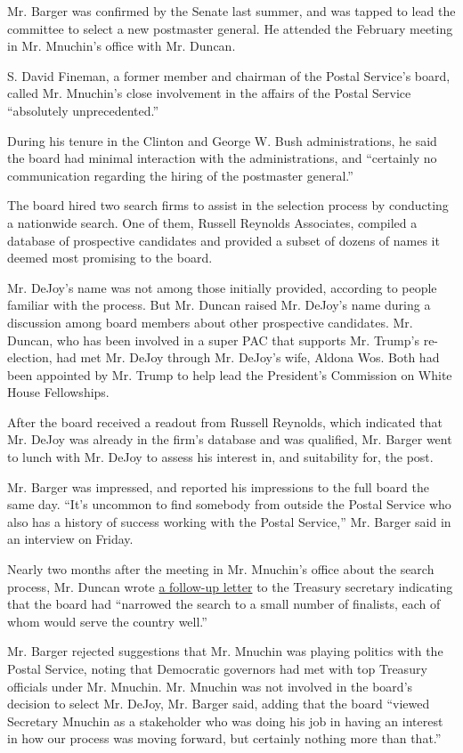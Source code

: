 Mr. Barger was confirmed by the Senate last summer, and was tapped to
lead the committee to select a new postmaster general. He attended the
February meeting in Mr. Mnuchin's office with Mr. Duncan.

S. David Fineman, a former member and chairman of the Postal Service's
board, called Mr. Mnuchin's close involvement in the affairs of the
Postal Service ``absolutely unprecedented.''

During his tenure in the Clinton and George W. Bush administrations, he
said the board had minimal interaction with the administrations, and
``certainly no communication regarding the hiring of the postmaster
general.''

The board hired two search firms to assist in the selection process by
conducting a nationwide search. One of them, Russell Reynolds
Associates, compiled a database of prospective candidates and provided a
subset of dozens of names it deemed most promising to the board.

Mr. DeJoy's name was not among those initially provided, according to
people familiar with the process. But Mr. Duncan raised Mr. DeJoy's name
during a discussion among board members about other prospective
candidates. Mr. Duncan, who has been involved in a super PAC that
supports Mr. Trump's re-election, had met Mr. DeJoy through Mr. DeJoy's
wife, Aldona Wos. Both had been appointed by Mr. Trump to help lead the
President's Commission on White House Fellowships.

After the board received a readout from Russell Reynolds, which
indicated that Mr. DeJoy was already in the firm's database and was
qualified, Mr. Barger went to lunch with Mr. DeJoy to assess his
interest in, and suitability for, the post.

Mr. Barger was impressed, and reported his impressions to the full board
the same day. ``It's uncommon to find somebody from outside the Postal
Service who also has a history of success working with the Postal
Service,'' Mr. Barger said in an interview on Friday.

Nearly two months after the meeting in Mr. Mnuchin's office about the
search process, Mr. Duncan wrote
\href{https://s3.amazonaws.com/storage.citizensforethics.org/wp-content/uploads/2020/08/19160346/COVID-19-VIP-Duncan-USPS-Board-Chairman-on.pdf}{a
follow-up letter} to the Treasury secretary indicating that the board
had ``narrowed the search to a small number of finalists, each of whom
would serve the country well.''

Mr. Barger rejected suggestions that Mr. Mnuchin was playing politics
with the Postal Service, noting that Democratic governors had met with
top Treasury officials under Mr. Mnuchin. Mr. Mnuchin was not involved
in the board's decision to select Mr. DeJoy, Mr. Barger said, adding
that the board ``viewed Secretary Mnuchin as a stakeholder who was doing
his job in having an interest in how our process was moving forward, but
certainly nothing more than that.''

